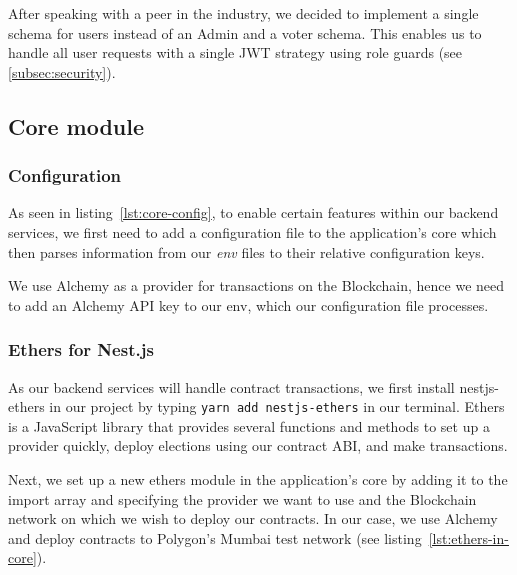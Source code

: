After speaking with a peer in the industry, we decided to implement a single schema for users instead of an \gls{Admin} and a voter schema.
This enables us to handle all user requests with a single \gls{JWT} strategy using role guards (see \cref{subsec:security}).

\subsection{Core module}\label{subsec:core-module}

\subsubsection{Configuration}

As seen in listing~\ref{lst:core-config}, to enable certain features within our backend services, we first need to add a configuration file to the application's core which then parses information from our \emph{env} files to their relative configuration keys.


We use Alchemy as a provider for transactions on the \gls{Blockchain}, hence we need to add an Alchemy \gls{API} key to our env, which our configuration file processes.

\subsubsection{Ethers for Nest.js}

As our backend services will handle contract transactions, we first install nestjs-ethers in our project by typing \texttt{yarn add nestjs-ethers} in our terminal.
Ethers is a JavaScript library that provides several functions and methods to set up a provider quickly, deploy elections using our contract \gls{ABI}, and make transactions.

Next, we set up a new ethers module in the application's core by adding it to the import array and specifying the provider we want to use and the \gls{Blockchain} network on which we wish to deploy our contracts.
In our case, we use Alchemy and deploy contracts to Polygon’s Mumbai test network (see listing~\ref{lst:ethers-in-core}).



